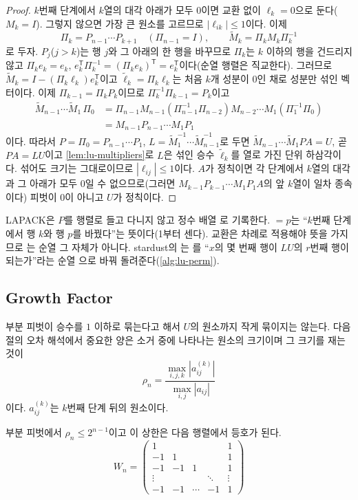 \begin{proof}
$k$번째 단계에서 $k$열의 대각 아래가 모두 $0$이면 교환 없이 $\ell_k=0$으로 둔다($M_k=I$). 그렇지 않으면 가장 큰 원소를 고르므로 $|\ell_{ik}|\le1$이다. 이제
\[
\Pi_k=P_{n-1}\cdots P_{k+1}\quad(\Pi_{n-1}=I),\qquad\tilde M_k=\Pi_kM_k\Pi_k^{-1}
\]
로 두자. $P_j$($j>k$)는 행 $j$와 그 아래의 한 행을 바꾸므로 $\Pi_k$는 $k$ 이하의 행을 건드리지 않고 $\Pi_ke_k=e_k$, $e_k^{\mathsf T}\Pi_k^{-1}=(\Pi_ke_k)^{\mathsf T}=e_k^{\mathsf T}$이다(순열 행렬은 직교한다). 그러므로 $\tilde M_k=I-(\Pi_k\ell_k)e_k^{\mathsf T}$이고 $\tilde\ell_k=\Pi_k\ell_k$는 처음 $k$개 성분이 $0$인 채로 성분만 섞인 벡터이다. 이제 $\Pi_{k-1}=\Pi_kP_k$이므로 $\Pi_k^{-1}\Pi_{k-1}=P_k$이고
\begin{align*}
\tilde M_{n-1}\cdots\tilde M_1\,\Pi_0
&=\Pi_{n-1}M_{n-1}(\Pi_{n-1}^{-1}\Pi_{n-2})M_{n-2}\cdots M_1(\Pi_1^{-1}\Pi_0)\\
&=M_{n-1}P_{n-1}\cdots M_1P_1
\end{align*}
이다. 따라서 $P=\Pi_0=P_{n-1}\cdots P_1$, $L=\tilde M_1^{-1}\cdots\tilde M_{n-1}^{-1}$로 두면 $\tilde M_{n-1}\cdots\tilde M_1PA=U$, 곧 $PA=LU$이고 \cref{lem:lu-multipliers}로 $L$은 섞인 승수 $\tilde\ell_k$를 열로 가진 단위 하삼각이다. 섞어도 크기는 그대로이므로 $|\ell_{ij}|\le1$이다. $A$가 정칙이면 각 단계에서 $k$열의 대각과 그 아래가 모두 $0$일 수 없으므로(그러면 $M_{k-1}P_{k-1}\cdots M_1P_1A$의 앞 $k$열이 일차 종속이다) 피벗이 $0$이 아니고 $U$가 정칙이다.
\end{proof}

LAPACK은 $P$를 행렬로 들고 다니지 않고 정수 배열 로 기록한다.  $=p$는 ``$k$번째 단계에서 행 $k$와 행 $p$를 바꿨다''는 뜻이다(1부터 센다). 교환은 차례로 적용해야 뜻을 가지므로 는 순열 그 자체가 아니다. stardust의 는 를 ``$x$의 몇 번째 행이 $LU$의 $r$번째 행이 되는가''라는 순열 으로 바꿔 돌려준다(\cref{alg:lu-perm}).

\subsection{Growth Factor}

부분 피벗이 승수를 $1$ 이하로 묶는다고 해서 $U$의 원소까지 작게 묶이지는 않는다. 다음 절의 오차 해석에서 중요한 양은 소거 중에 나타나는 원소의 크기이며 그 크기를 재는 것이 
\[
\rho_n=\frac{\max_{i,j,k}|a^{(k)}_{ij}|}{\max_{i,j}|a_{ij}|}
\]
이다. $a^{(k)}_{ij}$는 $k$번째 단계 뒤의 원소이다.

\begin{proposition}
\label{prop:lu-growth-bound}
부분 피벗에서 $\rho_n\le2^{n-1}$이고 이 상한은 다음 행렬에서 등호가 된다.
\[
W_n=\begin{pmatrix}
1&&&&1\\
-1&1&&&1\\
-1&-1&1&&1\\
\vdots&&&\ddots&\vdots\\
-1&-1&\cdots&-1&1
\end{pmatrix}
\]
\end{proposition}

